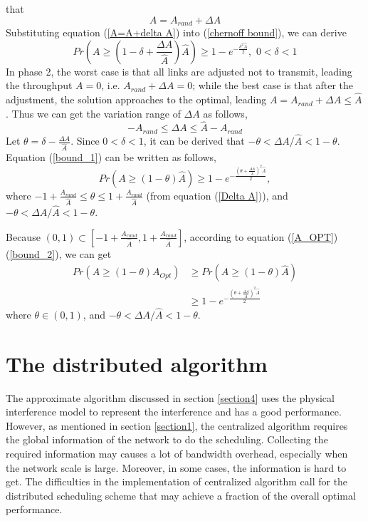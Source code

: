 \documentclass[conference]{IEEEtran}
\begin{document}
\begin{IEEEproof}
that
\begin{equation}\label{A=A+delta A}
A=A_{rand}+\Delta A
\end{equation}
Substituting equation (\ref{A=A+delta A}) into (\ref{chernoff
bound}), we can derive
\begin{equation}\label{bound_1}
Pr(A\geq(1-\delta+\frac{\Delta A}{\hat{A}})\hat{A})\geq
1-e^{-\frac{\delta^2\hat{A}}{2}},\,\, 0<\delta<1
\end{equation}
In phase 2, the worst case is that all links are adjusted not to
transmit, leading the throughput $A=0$, i.e. $A_{rand}+\Delta A =
0$; while the best case is that after the adjustment, the solution
approaches to the optimal, leading $A=A_{rand}+\Delta A\leq
\hat{A}$. Thus we can get the variation range of $\Delta A$ as
follows,
\begin{equation}\label{Delta A}
-A_{rand}\leq \Delta A \leq \hat{A}-A_{rand}
\end{equation}
Let $\theta=\delta-\frac{\Delta A}{\hat{A}}$. Since $0<\delta<1$, it
can be derived that $-\theta<\Delta A/\hat{A}<1-\theta$. Equation
(\ref{bound_1}) can be written as follows,
\begin{equation}\label{bound_2}
Pr(A\geq(1-\theta)\hat{A})\geq 1-e^{-\frac{(\theta + \frac{\Delta
A}{\hat{A}})^2\hat{A}}{2}},
\end{equation}
where $-1+\frac{A_{rand}}{\hat{A}}\leq\theta \leq
1+\frac{A_{rand}}{\hat{A}}$ (from equation (\ref{Delta A})), and
$-\theta<\Delta A/\hat{A}<1-\theta$.

Because $(0,1)\subset
[-1+\frac{A_{rand}}{\hat{A}},1+\frac{A_{rand}}{\hat{A}}]$, according
to equation (\ref{A_OPT})(\ref{bound_2}), we can get
\begin{eqnarray}
Pr(A\geq(1-\theta)A_{Opt})&\geq Pr(A\geq(1-\theta)\hat{A})\nonumber \\
                          &\geq 1-e^{-\frac{(\theta + \frac{\Delta A}{\hat{A}})^2\hat{A}}{2}}
\end{eqnarray}
where $\theta \in (0,1)$, and $-\theta<\Delta A/\hat{A}<1-\theta$.

\end{IEEEproof}

\section{The distributed algorithm}\label{section5}
The approximate algorithm discussed in section \ref{section4} uses
the physical interference model to represent the interference and
has a good performance. However, as mentioned in section
\ref{section1}, the centralized algorithm requires the global
information of the network to do the scheduling. Collecting the
required information may causes a lot of bandwidth overhead,
especially when the network scale is large. Moreover, in some cases,
the information is hard to get. The difficulties in the
implementation of centralized algorithm call for the distributed
scheduling scheme that may achieve a fraction of the overall optimal
performance.
\end{document}
